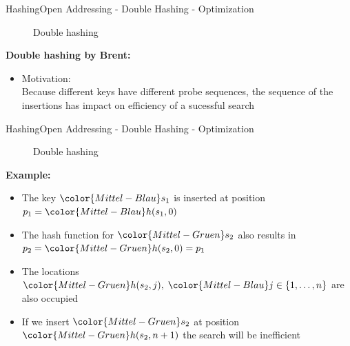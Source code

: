 \begin{frame}{Hashing}{Open Addressing - Double Hashing - Optimization}
  \vspace{-2.0em}
  \begin{figure}[!h]
    \begin{adjustbox}{width=0.9\linewidth}%
    \end{adjustbox}
    \vspace{-1.0em}
    \caption{Double hashing}%
    \label{fig:hashing:open_addressing:double_hashing_no_brent}%
  \end{figure}
  \textbf{Double hashing by Brent:}
  \begin{itemize}
    \item<2-> Motivation:\\
      Because different keys have different probe sequences,
      the sequence of the insertions has impact on efficiency of a sucessful search
  \end{itemize}
\end{frame}


\begin{frame}{Hashing}{Open Addressing - Double Hashing - Optimization}
  \vspace{-2.0em}
  \begin{figure}[!h]
    \begin{adjustbox}{width=0.9\linewidth}%
    \end{adjustbox}
    \vspace{-1.0em}
    \caption{Double hashing}%
    \label{fig:hashing:open_addressing:double_hashing_no_brent2}%
  \end{figure}
  \vspace{-1.0em}
  \textbf{Example:}
  \begin{itemize}
    \item<1->
      The key ${\color{Mittel-Blau}s_1}$ is inserted at position
      \begin{math}
        p_1 = {\color{Mittel-Blau}h(s_1, 0)}
      \end{math}
    \item<2->
      The hash function for ${\color{Mittel-Gruen}s_2}$ also results in
      \begin{math}
        p_2 = {\color{Mittel-Gruen}h(s_2, 0)} = p_1
      \end{math}
    \item<3->
      The locations
      \begin{math}
        {\color{Mittel-Gruen}h(s_2, j)}, \;
        {\color{Mittel-Blau}j} \in \{1,\dots,n\}
      \end{math}
      are also occupied
    \item<6->
      If we insert ${\color{Mittel-Gruen}s_2}$ at position
      ${\color{Mittel-Gruen}h(s_2, n + 1)}$ the search will be inefficient
  \end{itemize}
\end{frame}

